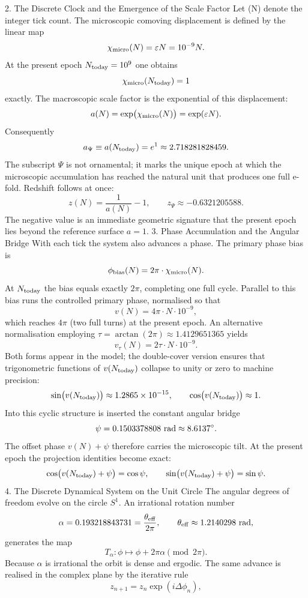 2. The Discrete Clock and the Emergence of the Scale Factor
Let (N) denote the integer tick count. The microscopic comoving displacement is defined by the linear map
\[
\chi_{\rm micro}(N)=\varepsilon N=10^{-9}N.
\]
At the present epoch \(N_{\rm today}=10^{9}\) one obtains
\[
\chi_{\rm micro}(N_{\rm today})=1
\]
exactly. The macroscopic scale factor is the exponential of this displacement:
\[
a(N)=\exp\bigl(\chi_{\rm micro}(N)\bigr)=\exp(\varepsilon N).
\]
Consequently
\[
a_{\Psi}\equiv a(N_{\rm today})=e^{1}\approx 2.718281828459.
\]
The subscript \(\Psi\) is not ornamental; it marks the unique epoch at which the microscopic accumulation has reached the natural unit that produces one full e-fold. Redshift follows at once:
\[
z(N)=\frac{1}{a(N)}-1,\qquad z_{\Psi}\approx-0.6321205588.
\]
The negative value is an immediate geometric signature that the present epoch lies beyond the reference surface \(a=1\).
3. Phase Accumulation and the Angular Bridge
With each tick the system also advances a phase. The primary phase bias is
\[
\phi_{\rm bias}(N)=2\pi\cdot\chi_{\rm micro}(N).
\]
At \(N_{\rm today}\) the bias equals exactly \(2\pi\), completing one full cycle. Parallel to this bias runs the controlled primary phase, normalised so that
\[
v(N)=4\pi\cdot N\cdot 10^{-9},
\]
which reaches \(4\pi\) (two full turns) at the present epoch. An alternative normalisation employing \(\tau=\arctan(2\pi)\approx 1.4129651365\) yields
\[
v_{\tau}(N)=2\tau\cdot N\cdot 10^{-9}.
\]
Both forms appear in the model; the double-cover version ensures that trigonometric functions of \(v(N_{\rm today})\) collapse to unity or zero to machine precision:
\[
\sin\bigl(v(N_{\rm today})\bigr)\approx 1.2865\times 10^{-15},\qquad\cos\bigl(v(N_{\rm today})\bigr)\approx 1.
\]
Into this cyclic structure is inserted the constant angular bridge
\[
\psi=0.1503378808\ {\rm rad}\approx 8.6137^\circ.
\]
The offset phase \(v(N)+\psi\) therefore carries the microscopic tilt. At the present epoch the projection identities become exact:
\[
\cos\bigl(v(N_{\rm today})+\psi\bigr)=\cos\psi,\qquad\sin\bigl(v(N_{\rm today})+\psi\bigr)=\sin\psi.
\]
4. The Discrete Dynamical System on the Unit Circle
The angular degrees of freedom evolve on the circle \(S^{1}\). An irrational rotation number
\[
\alpha=0.193218843731=\frac{\theta_{\rm eff}}{2\pi},\qquad\theta_{\rm eff}\approx 1.2140298\ {\rm rad},
\]
generates the map
\[
T_{\alpha}:\phi\mapsto\phi+2\pi\alpha\pmod{2\pi}.
\]
Because \(\alpha\) is irrational the orbit is dense and ergodic. The same advance is realised in the complex plane by the iterative rule
\[
z_{n+1}=z_{n}\exp(i\Delta\phi_{n}),
\]

